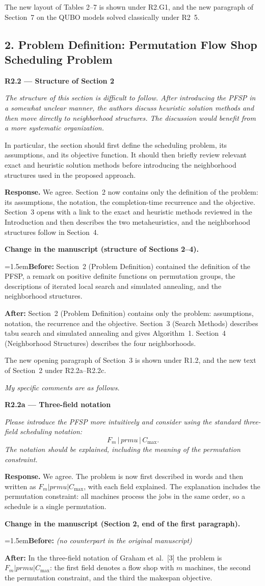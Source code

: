 \documentclass[12pt]{article}
\newenvironment{rc}[1]{\par\medskip\noindent\textbf{#1}\par\nopagebreak\noindent\itshape\renewcommand{\emph}[1]{\textbf{##1}}\ignorespaces}{\par}
\newenvironment{lead}{\par\medskip\noindent\itshape\renewcommand{\emph}[1]{\textbf{##1}}\ignorespaces}{\par}
\newcommand{\answer}[1]{\par\smallskip\noindent\textbf{Response.} #1\par}
\newcommand{\change}[3]{\par\smallskip\noindent\textbf{Change in the manuscript (#1).}\par
  {\leftskip=1.5em\noindent\textbf{Before:} #2\par\noindent\textbf{After:} #3\par}}
\newcommand{\Cmax}{C_{\max}}
\begin{document}
The new layout of Tables 2--7 is shown under R2.G1, and the new paragraph of Section~7 on the QUBO models solved classically under R2~5.

\subsection*{2. Problem Definition: Permutation Flow Shop Scheduling Problem}

\begin{rc}{R2.2 --- Structure of Section 2}
The structure of this section is difficult to follow. After introducing the PFSP in a somewhat unclear manner, the authors discuss heuristic solution methods and then move directly to neighborhood structures. The discussion would benefit from a more systematic organization.

In particular, the section should first define the scheduling problem, its assumptions, and its objective function. It should then briefly review relevant exact and heuristic solution methods before introducing the neighborhood structures used in the proposed approach.
\end{rc}
\answer{We agree. Section~2 now contains only the definition of the problem: its assumptions, the notation, the completion-time recurrence and the objective. Section~3 opens with a link to the exact and heuristic methods reviewed in the Introduction and then describes the two metaheuristics, and the neighborhood structures follow in Section~4.}
\change{structure of Sections 2--4}{Section~2 (Problem Definition) contained the definition of the PFSP, a remark on positive definite functions on permutation groups, the descriptions of iterated local search and simulated annealing, and the neighborhood structures.}{Section~2 (Problem Definition) contains only the problem: assumptions, notation, the recurrence and the objective. Section~3 (Search Methods) describes tabu search and simulated annealing and gives Algorithm~1. Section~4 (Neighborhood Structures) describes the four neighborhoods.}
The new opening paragraph of Section~3 is shown under R1.2, and the new text of Section~2 under R2.2a--R2.2c.

\begin{lead}
My specific comments are as follows.
\end{lead}

\begin{rc}{R2.2a --- Three-field notation}
Please introduce the PFSP more intuitively and consider using the standard three-field scheduling notation:
\[ F_m \,|\, prmu \,|\, \Cmax . \]
The notation should be explained, including the meaning of the permutation constraint.
\end{rc}
\answer{We agree. The problem is now first described in words and then written as $F_m|prmu|\Cmax$, with each field explained. The explanation includes the permutation constraint: all machines process the jobs in the same order, so a schedule is a single permutation.}
\change{Section 2, end of the first paragraph}{\textit{(no counterpart in the original manuscript)}}{In the three-field notation of Graham et al.~[3] the problem is $F_m|prmu|C_{\max}$: the first field denotes a flow shop with $m$ machines, the second the permutation constraint, and the third the makespan objective.}
\end{document}
